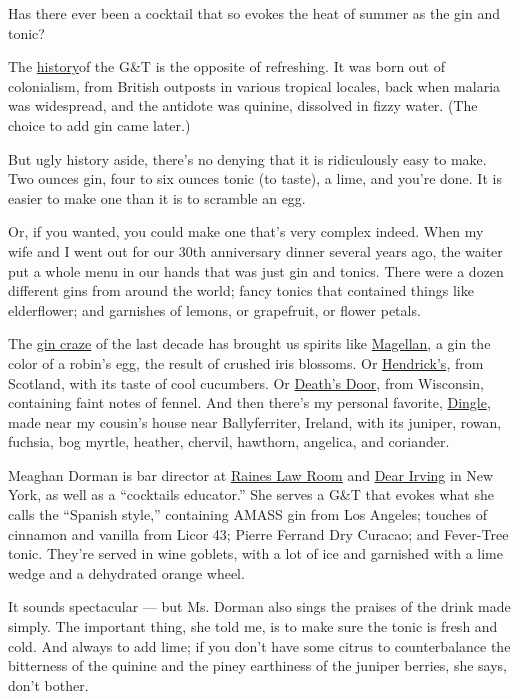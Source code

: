 Has there ever been a cocktail that so evokes the heat of summer as the
gin and tonic?

The
\href{https://www.kew.org/read-and-watch/just-the-tonic-history}{history}of
the G\&T is the opposite of refreshing. It was born out of colonialism,
from British outposts in various tropical locales, back when malaria was
widespread, and the antidote was quinine, dissolved in fizzy water. (The
choice to add gin came later.)

But ugly history aside, there's no denying that it is ridiculously easy
to make. Two ounces gin, four to six ounces tonic (to taste), a lime,
and you're done. It is easier to make one than it is to scramble an egg.

Or, if you wanted, you could make one that's very complex indeed. When
my wife and I went out for our 30th anniversary dinner several years
ago, the waiter put a whole menu in our hands that was just gin and
tonics. There were a dozen different gins from around the world; fancy
tonics that contained things like elderflower; and garnishes of lemons,
or grapefruit, or flower petals.

The
\href{https://www.barschool.net/us/blog/why-gin-so-popular-five-possible-theories}{gin
craze} of the last decade has brought us spirits like
\href{https://theginisin.com/gin-reviews/magellan-gin/}{Magellan}, a gin
the color of a robin's egg, the result of crushed iris blossoms. Or
\href{https://theginisin.com/gin-reviews/hendricks/}{Hendrick's}, from
Scotland, with its taste of cool cucumbers. Or
\href{https://www.ginfoundry.com/gin/deaths-door-gin/}{Death's Door},
from Wisconsin, containing faint notes of fennel. And then there's my
personal favorite,
\href{https://www.masterofmalt.com/gin/the-dingle-distillery/dingle-original-gin/}{Dingle},
made near my cousin's house near Ballyferriter, Ireland, with its
juniper, rowan, fuchsia, bog myrtle, heather, chervil, hawthorn,
angelica, and coriander.

Meaghan Dorman is bar director at
\href{http://www.raineslawroom.com/}{Raines Law Room} and
\href{https://www.dearirving.com/}{Dear Irving} in New York, as well as
a ``cocktails educator.'' She serves a G\&T that evokes what she calls
the ``Spanish style,'' containing AMASS gin from Los Angeles; touches of
cinnamon and vanilla from Licor 43; Pierre Ferrand Dry Curacao; and
Fever-Tree tonic. They're served in wine goblets, with a lot of ice and
garnished with a lime wedge and a dehydrated orange wheel.

It sounds spectacular --- but Ms. Dorman also sings the praises of the
drink made simply. The important thing, she told me, is to make sure the
tonic is fresh and cold. And always to add lime; if you don't have some
citrus to counterbalance the bitterness of the quinine and the piney
earthiness of the juniper berries, she says, don't bother.

